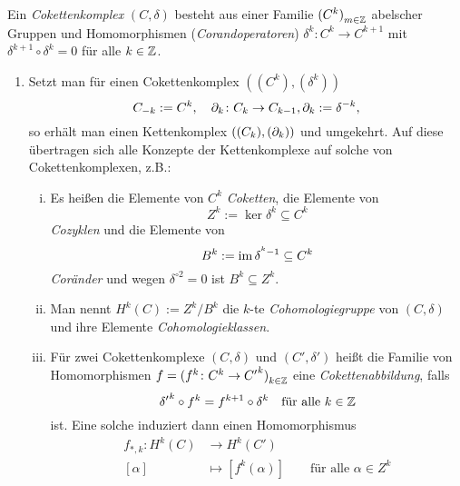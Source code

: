 \begin{defn}
  Ein \emph{Cokettenkomplex} $(C,\delta)$ besteht aus einer Familie ${(C^k)}_{m \in \mathbb{Z}}$ abelscher Gruppen und Homomorphismen (\emph{Corandoperatoren}) $\delta^k\colon C^k \to C^{k+1}$ mit $\delta^{k+1} \circ \delta^k = 0$ für alle $k \in \mathbb{Z}$.
\end{defn}
\begin{kommentar}
  \begin{enumerate}
    \item 
      Setzt man für einen Cokettenkomplex $( (C^k), (\delta^k))$
      \begin{equation*}
        C_{-k} := C^k, \quad \partial_k\colon C_k \to C_{k-1}, \partial_k := \delta^{-k},
      \end{equation*}
      so erhält man einen Kettenkomplex $( (C_k), (\partial_k) )$ und umgekehrt.
      Auf diese übertragen sich alle Konzepte der Kettenkomplexe auf solche von Cokettenkomplexen, z.B.:
      \begin{enumerate}[(i)]
        \item 
          Es heißen die Elemente von $C^k$ \emph{Coketten}, die Elemente von
          \begin{equation*}
            Z^k := \ker \delta^k \subseteq C^k
          \end{equation*}
          \emph{Cozyklen} und die Elemente von
          \begin{equation*}
            B^k := \operatorname{im} \delta^{^k-1} \subseteq C^k
          \end{equation*}
          \emph{Coränder} und wegen $\delta^{\circ 2} = 0$ ist $B^k \subseteq  Z^k$.
        \item
          Man nennt $H^k(C) := Z^k/{B^k}$ die $k$-te \emph{Cohomologiegruppe} von $(C,\delta)$ und ihre Elemente \emph{Cohomologieklassen}.
        \item
          Für zwei Cokettenkomplexe $(C,\delta)$ und $(C',\delta')$ heißt die Familie von Homomorphismen $f = {(f^k\colon C^k \to {C'}^k)}_{k \in \mathbb{Z}}$ eine \emph{Cokettenabbildung}, falls
          \begin{equation*}
            {\delta'}^k \circ f^k = f^{k+1} \circ \delta^k \quad \text{für alle $k \in \mathbb{Z}$}
          \end{equation*}
          ist.
          Eine solche induziert dann einen Homomorphismus
          \begin{align*}
            f_{*,k}\colon H^k(C) & \to H^k(C') \\
            [\alpha] & \mapsto [f^k(\alpha)] \qquad \text{für alle $\alpha \in Z^k$}

\end{align*}
\end{enumerate}
\end{enumerate}
\end{kommentar}
